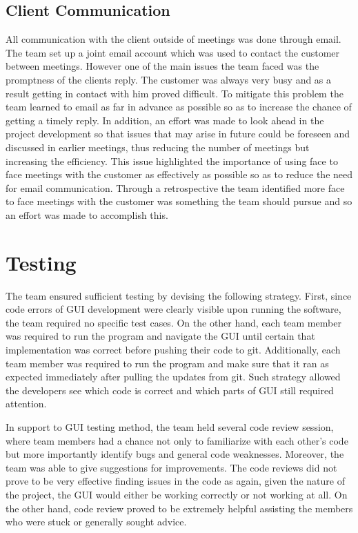 \documentclass{l3proj}
\begin{document}
\subsection{Client Communication}
All communication with the client outside of meetings was done through email. The team set up a joint email account which was used to contact the customer between meetings. However one of the main issues the team faced was the promptness of the clients reply. The customer was always very busy and as a result getting in contact with him proved difficult. To mitigate this problem the team learned to email as far in advance as possible so as to increase the chance of getting a timely reply. In addition, an effort was made to look ahead in the project development so that issues that may arise in future could be foreseen and discussed in earlier meetings, thus reducing the number of meetings but increasing the efficiency. This issue highlighted the importance of using face to face meetings with the customer as effectively as possible so as to reduce the need for email communication. Through a retrospective the team identified more face to face meetings with the customer was something the team should pursue and so an effort was made to accomplish this.

\section{Testing}
\label{sec:testing}
The team ensured sufficient testing by devising the following strategy. First, since code errors of GUI development were clearly visible upon running the software, the team required no specific test cases. On the other hand, each team member was required to run the program and navigate the GUI until certain that implementation was correct before pushing their code to git. Additionally, each team member was required to run the program and make sure that it ran as expected immediately after pulling the updates from git. Such strategy allowed the developers see which code is correct and which parts of GUI still required attention.

In support to GUI testing method, the team held several code review session, where team members had a chance not only to familiarize with each other's code but more importantly identify bugs and general code weaknesses. Moreover, the team was able to give suggestions for improvements. The code reviews did not prove to be very effective finding issues in the code as again, given the nature of the project, the GUI would either be working correctly or not working at all. On the other hand, code review proved to be extremely helpful assisting the members who were stuck or generally sought advice.
\end{document}
